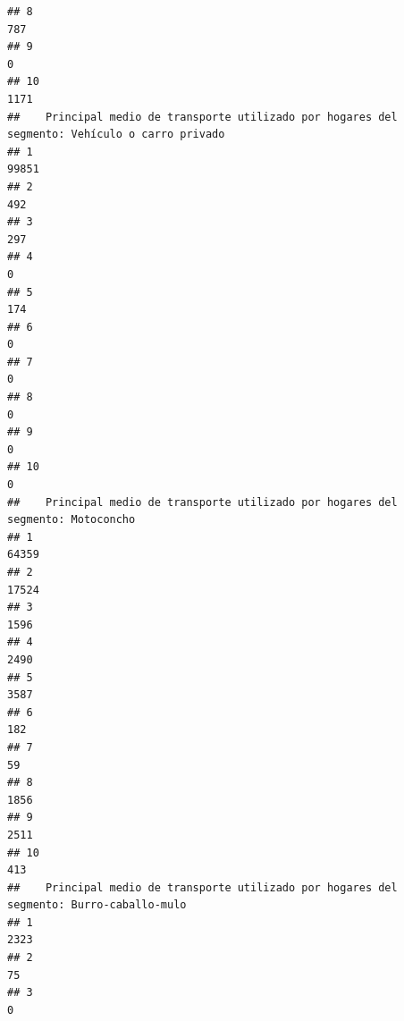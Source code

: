 \documentclass[11pt,]{article}
\begin{document}
\begin{verbatim}
## 8                                                                              787
## 9                                                                                0
## 10                                                                            1171
##    Principal medio de transporte utilizado por hogares del segmento: Vehículo o carro privado
## 1                                                                                       99851
## 2                                                                                         492
## 3                                                                                         297
## 4                                                                                           0
## 5                                                                                         174
## 6                                                                                           0
## 7                                                                                           0
## 8                                                                                           0
## 9                                                                                           0
## 10                                                                                          0
##    Principal medio de transporte utilizado por hogares del segmento: Motoconcho
## 1                                                                         64359
## 2                                                                         17524
## 3                                                                          1596
## 4                                                                          2490
## 5                                                                          3587
## 6                                                                           182
## 7                                                                            59
## 8                                                                          1856
## 9                                                                          2511
## 10                                                                          413
##    Principal medio de transporte utilizado por hogares del segmento: Burro-caballo-mulo
## 1                                                                                  2323
## 2                                                                                    75
## 3                                                                                     0

\end{verbatim}
\end{document}
